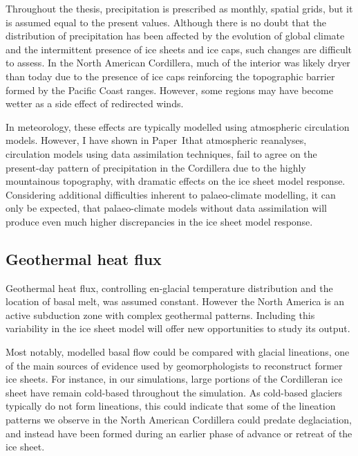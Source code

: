\documentclass{article}
\newcommand{\CCLI}[0]{Paper~I}      %
\begin{document}
Throughout the thesis, precipitation is prescribed as monthly, spatial grids,
but it is assumed equal to the present values. Although there is no doubt that
the distribution of precipitation has been affected by the evolution of global
climate and the intermittent presence of ice sheets and ice caps, such changes
are difficult to assess. In the North American Cordillera, much of the interior
was likely dryer than today due to the presence of ice caps reinforcing the
topographic barrier formed by the Pacific Coast ranges. However, some regions
may have become wetter as a side effect of redirected winds.

In meteorology, these effects are typically modelled using atmospheric
circulation models. However, I have shown in \CCLI that atmospheric reanalyses,
circulation models using data assimilation techniques, fail to agree on the
present-day pattern of precipitation in the Cordillera due to the highly
mountainous topography, with dramatic effects on the ice sheet model response.
Considering additional difficulties inherent to palaeo-climate modelling, it
can only be expected, that palaeo-climate models without data assimilation will
produce even much higher discrepancies in the ice sheet model response.


\subsection{Geothermal heat flux}

Geothermal heat flux, controlling en-glacial temperature distribution and the
location of basal melt, was assumed constant. However the North America is an
active subduction zone with complex geothermal patterns. Including this
variability in the ice sheet model will offer new opportunities to study its
output.

Most notably, modelled basal flow could be compared with glacial lineations,
one of the main sources of evidence used by geomorphologists to reconstruct
former ice sheets. For instance, in our simulations, large portions of the
Cordilleran ice sheet have remain cold-based throughout the simulation. As
cold-based glaciers typically do not form lineations, this could indicate that
some of the lineation patterns we observe in the North American Cordillera
could predate deglaciation, and instead have been formed during an earlier
phase of advance or retreat of the ice sheet.
\end{document}

